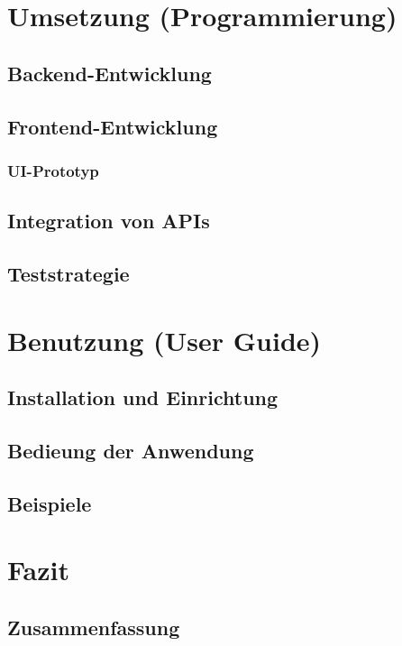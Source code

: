 \documentclass[a4paper]{article}
\begin{document}
\section{Umsetzung (Programmierung)}

\subsection{Backend-Entwicklung}

\subsection{Frontend-Entwicklung}

\subsubsection{UI-Prototyp}

\subsection{Integration von APIs}

\subsection{Teststrategie}

\section{Benutzung (User Guide)}

\subsection{Installation und Einrichtung}

\subsection{Bedieung der Anwendung}

\subsection{Beispiele}

\section{Fazit}

\subsection{Zusammenfassung}
\end{document}
